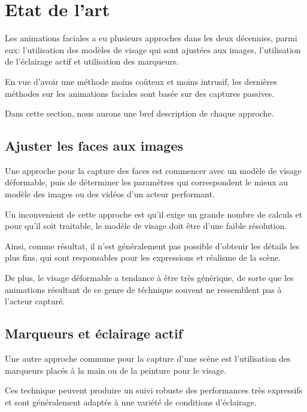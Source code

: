 \documentclass[a4paper,12pt]{article}
\begin{document}
\section{Etat de l'art}

Les animations faciales a eu plusieurs approches dans les deux décennies, 
parmi eux: l'utilisation des modèles de visage qui sont ajustées aux images, 
l'utilisation de l'éclairage actif et utilisation des marqueurs.

En vue d'avoir une méthode moins coûteux et moins intrusif, les dernières
méthodes sur les animations faciales sont basée sur des captures passives.


Dans cette section, nous aurons une bref description de chaque
approche.

\subsection*{Ajuster les faces aux images}
Une approche pour la capture des faces est commencer avec un modèle
de visage déformable, puis de déterminer les paramètres qui
correspondent le mieux au modèle des images ou des vidéos d'un acteur
performant. 

Un inconvenient de cette approche est qu'il exige un grande nombre de
calculs et pour qu'il soit traitable, le modèle de visage doit être
d'une faible résolution.

Ainsi, comme résultat, il n'est généralement pas possible d'obtenir les
détails les plus fins, qui sont responsables pour les expressions et
réalisme de la scène.

De plus, le visage déformable a tendance à être très générique, de
sorte que les animations résultant de ce genre de téchnique souvent ne
ressemblent pas à l'acteur capturé.

\subsection*{Marqueurs et éclairage actif}

Une autre approche commune pour la capture d'une scène est
l'utilisation des marqueurs placés à la main ou de la peinture pour le
visage.

Ces technique peuvent produire un suivi robuste des performances très
expressifs et sont généralement adaptés à une variété de conditions
d'éclairage.
\end{document}
